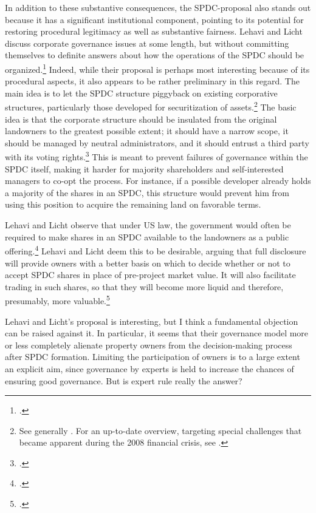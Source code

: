 \documentclass[12pt,a4paper]{book} %
\begin{document}
In addition to these substantive consequences, the SPDC-proposal also stands out because it has a significant institutional component, pointing to its potential for restoring procedural legitimacy as well as substantive fairness. Lehavi and Licht discuss corporate governance issues at some length, but without committing themselves to definite answers about how the operations of the SPDC should be organized.\footcite[1040-1048]{lehavi07} Indeed, while their proposal is perhaps most interesting because of its procedural aspects, it also appears to be rather preliminary in this regard. The main idea is to let the SPDC structure piggyback on existing corporative structures, particularly those developed for securitization of assets.\footnote{See generally \cite{schwarcz94}. For an up-to-date overview, targeting special challenges that became apparent during the 2008 financial crisis, see \cite{schwarcz13}.} The basic idea is that the corporate structure should be insulated from the original landowners to the greatest possible extent; it should have a narrow scope, it should be managed by neutral administrators, and it should entrust a third party with its voting rights.\footcite[1742]{lehavi07} This is meant to prevent failures of governance within the SPDC itself, making it harder for majority shareholders and self-interested managers to co-opt the process. For instance, if a possible developer already holds a majority of the shares in an SPDC, this structure would prevent him from using this position to acquire the remaining land on favorable terms. 

Lehavi and Licht observe that under US law, the government would often be required to make shares in an SPDC available to the landowners as a public offering.\footcite[1745]{lehavi07} Lehavi and Licht deem this to be desirable, arguing that full disclosure will provide owners with a better basis on which to decide whether or not to accept SPDC shares in place of pre-project market value. It will also facilitate trading in such shares, so that they will become more liquid and therefore, presumably, more valuable.\footcite[1746]{lehavi07} 

Lehavi and Licht's proposal is interesting, but I think a fundamental objection can be raised against it. In particular, it seems that their governance model more or less completely alienate property owners from the decision-making process after SPDC formation. Limiting the participation of owners is to a large extent an explicit aim, since governance by experts is held to increase the chances of ensuring good governance. But is expert rule really the answer?
\end{document}
